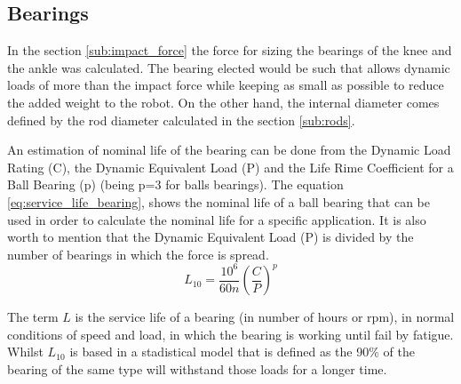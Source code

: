 
\subsection{Bearings} %
\label{sub:bearings}
In the section \ref{sub:impact_force} the force for sizing the bearings of the knee and the ankle was calculated.
The bearing elected would be such that allows dynamic loads of more than the impact force while keeping as small as possible to reduce the added weight to the robot.
On the other hand, the internal diameter comes defined by the rod diameter calculated in the section \ref{sub:rods}.

An estimation of nominal life of the bearing can be done from the Dynamic Load Rating (C), the Dynamic Equivalent Load (P) and the Life Rime Coefficient for a Ball Bearing (p) (being p=3 for balls bearings).
The equation \ref{eq:service_life_bearing}, shows the nominal life of a ball bearing that can be used in order to calculate the nominal life for a specific application.
It is also worth to mention that the Dynamic Equivalent Load (P) is divided by the number of bearings in which the force is spread.
\begin{equation}
  \label{eq:service_life_bearing}
  L_{10} = \frac{10^{6}}{60 n} \left(\frac{C}{P}\right)^{p}
\end{equation}

The term $L$ is the service life of a bearing (in number of hours or rpm), in normal conditions of speed and load, in which the bearing is working until fail by fatigue. 
Whilst $L_{10}$ is based in a stadistical model that is defined as the 90\% of the bearing of the same type will withstand those loads for a longer time.
